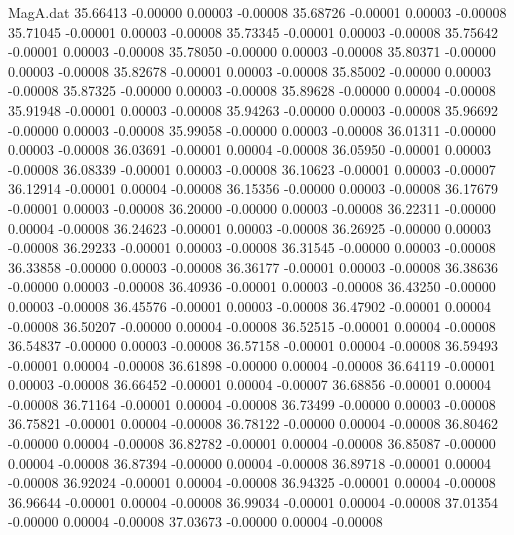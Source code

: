 \begin{filecontents}{MagA.dat}
  35.66413   -0.00000    0.00003   -0.00008
  35.68726   -0.00001    0.00003   -0.00008
  35.71045   -0.00001    0.00003   -0.00008
  35.73345   -0.00001    0.00003   -0.00008
  35.75642   -0.00001    0.00003   -0.00008
  35.78050   -0.00000    0.00003   -0.00008
  35.80371   -0.00000    0.00003   -0.00008
  35.82678   -0.00001    0.00003   -0.00008
  35.85002   -0.00000    0.00003   -0.00008
  35.87325   -0.00000    0.00003   -0.00008
  35.89628   -0.00000    0.00004   -0.00008
  35.91948   -0.00001    0.00003   -0.00008
  35.94263   -0.00000    0.00003   -0.00008
  35.96692   -0.00000    0.00003   -0.00008
  35.99058   -0.00000    0.00003   -0.00008
  36.01311   -0.00000    0.00003   -0.00008
  36.03691   -0.00001    0.00004   -0.00008
  36.05950   -0.00001    0.00003   -0.00008
  36.08339   -0.00001    0.00003   -0.00008
  36.10623   -0.00001    0.00003   -0.00007
  36.12914   -0.00001    0.00004   -0.00008
  36.15356   -0.00000    0.00003   -0.00008
  36.17679   -0.00001    0.00003   -0.00008
  36.20000   -0.00000    0.00003   -0.00008
  36.22311   -0.00000    0.00004   -0.00008
  36.24623   -0.00001    0.00003   -0.00008
  36.26925   -0.00000    0.00003   -0.00008
  36.29233   -0.00001    0.00003   -0.00008
  36.31545   -0.00000    0.00003   -0.00008
  36.33858   -0.00000    0.00003   -0.00008
  36.36177   -0.00001    0.00003   -0.00008
  36.38636   -0.00000    0.00003   -0.00008
  36.40936   -0.00001    0.00003   -0.00008
  36.43250   -0.00000    0.00003   -0.00008
  36.45576   -0.00001    0.00003   -0.00008
  36.47902   -0.00001    0.00004   -0.00008
  36.50207   -0.00000    0.00004   -0.00008
  36.52515   -0.00001    0.00004   -0.00008
  36.54837   -0.00000    0.00003   -0.00008
  36.57158   -0.00001    0.00004   -0.00008
  36.59493   -0.00001    0.00004   -0.00008
  36.61898   -0.00000    0.00004   -0.00008
  36.64119   -0.00001    0.00003   -0.00008
  36.66452   -0.00001    0.00004   -0.00007
  36.68856   -0.00001    0.00004   -0.00008
  36.71164   -0.00001    0.00004   -0.00008
  36.73499   -0.00000    0.00003   -0.00008
  36.75821   -0.00001    0.00004   -0.00008
  36.78122   -0.00000    0.00004   -0.00008
  36.80462   -0.00000    0.00004   -0.00008
  36.82782   -0.00001    0.00004   -0.00008
  36.85087   -0.00000    0.00004   -0.00008
  36.87394   -0.00000    0.00004   -0.00008
  36.89718   -0.00001    0.00004   -0.00008
  36.92024   -0.00001    0.00004   -0.00008
  36.94325   -0.00001    0.00004   -0.00008
  36.96644   -0.00001    0.00004   -0.00008
  36.99034   -0.00001    0.00004   -0.00008
  37.01354   -0.00000    0.00004   -0.00008
  37.03673   -0.00000    0.00004   -0.00008

\end{filecontents}
